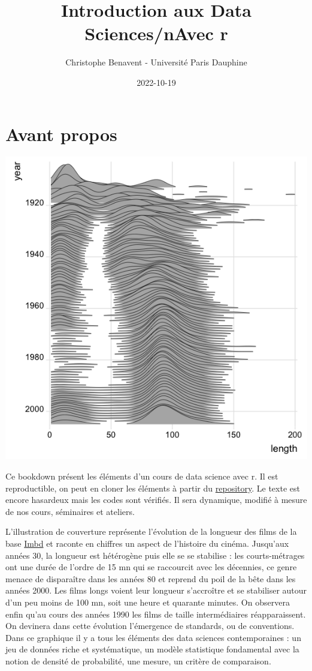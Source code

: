 \documentclass[
]{book}
\title{Introduction aux Data Sciences/nAvec r}
\author{Christophe Benavent - Université Paris Dauphine}
\date{2022-10-19}
\begin{document}
\maketitle

{
\setcounter{tocdepth}{1}
\tableofcontents
}
\hypertarget{avant-propos}{%
\chapter{Avant propos}\label{avant-propos}}

\includegraphics{./Images/ggridge.png}

Ce bookdown présent les éléments d'un cours de data science avec r. Il est reproductible, on peut en cloner les éléments à partir du \href{https://github.com/BenaventC/DataScienceBook}{repository}. Le texte est encore hasardeux mais les codes sont vérifiés. Il sera dynamique, modifié à mesure de nos cours, séminaires et ateliers.

L'illustration de couverture représente l'évolution de la longueur des films de la base \href{https://www.imdb.com/}{Imbd} et raconte en chiffres un aspect de l'histoire du cinéma. Jusqu'aux années 30, la longueur est hétérogène puis elle se se stabilise : les courts-métrages ont une durée de l'ordre de 15 mn qui se raccourcit avec les décennies, ce genre menace de disparaître dans les années 80 et reprend du poil de la bête dans les années 2000. Les films longs voient leur longueur s'accroître et se stabiliser autour d'un peu moins de 100 mn, soit une heure et quarante minutes. On observera enfin qu'au cours des années 1990 les films de taille intermédiaires réapparaissent. On devinera dans cette évolution l'émergence de standards, ou de conventions. Dans ce graphique il y a tous les éléments des data sciences contemporaines : un jeu de données riche et systématique, un modèle statistique fondamental avec la notion de densité de probabilité, une mesure, un critère de comparaison.
\end{document}
